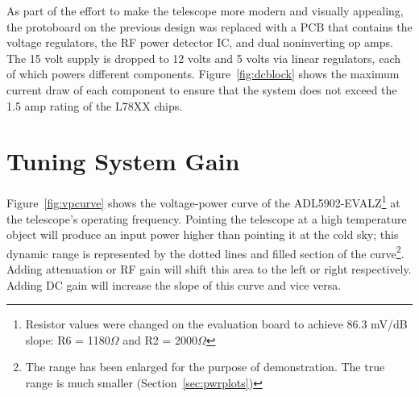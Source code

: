 \documentclass[titlepage]{article}
\begin{document}
As part of the effort to make the telescope more modern and visually appealing, the protoboard on the previous design was replaced with a PCB that contains the voltage regulators, the RF power detector IC, and dual noninverting op amps. The 15 volt supply is dropped to 12 volts and 5 volts via linear regulators, each of which powers different components. Figure~\ref{fig:dcblock} shows the maximum current draw of each component to ensure that the system does not exceed the 1.5 amp rating of the L78XX chips.


\section{Tuning System Gain}
\label{sec:tuning}
Figure~\ref{fig:vpcurve} shows the voltage-power curve of the ADL5902-EVALZ\footnote{Resistor values were changed on the evaluation board to achieve 86.3 mV/dB slope: R6 = 1180$\Omega$ and R2 = 2000$\Omega$} at the telescope's operating frequency. Pointing the telescope at a high temperature object will produce an input power higher than pointing it at the cold sky; this dynamic range is represented by the dotted lines and filled section of the curve\footnote{The range has been enlarged for the purpose of demonstration. The true range is much smaller (Section~\ref{sec:pwrplots})}. Adding attenuation or RF gain will shift this area to the left or right respectively. Adding DC gain will increase the slope of this curve and vice versa.
\end{document}
